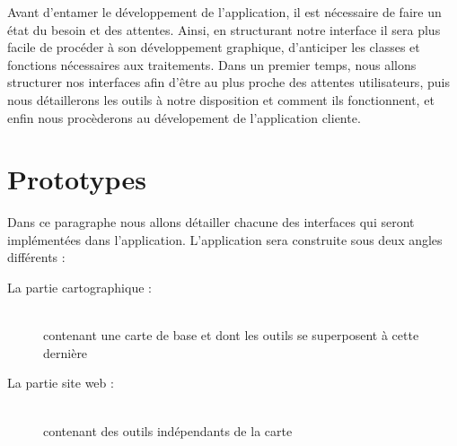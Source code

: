 
Avant d'entamer le développement de l'application, il est nécessaire de faire un état du besoin et des attentes. Ainsi, en structurant notre interface il sera plus facile de procéder à son développement graphique, d'anticiper les classes et fonctions nécessaires aux traitements. Dans un premier temps, nous allons structurer nos interfaces afin d'être au plus proche des attentes utilisateurs, puis nous détaillerons les outils à notre disposition et comment ils fonctionnent, et enfin nous procèderons au dévelopement de l'application cliente.


\section{Prototypes}


Dans ce paragraphe nous allons détailler chacune des interfaces qui seront implémentées dans l'application. L'application sera construite sous deux angles différents :
\begin{description}
  \item[La partie cartographique :] \hfill \\ contenant une carte de base et dont les outils se superposent à cette dernière
  \item[La partie site web :] \hfill \\ contenant des outils indépendants de la carte
\end{description}


